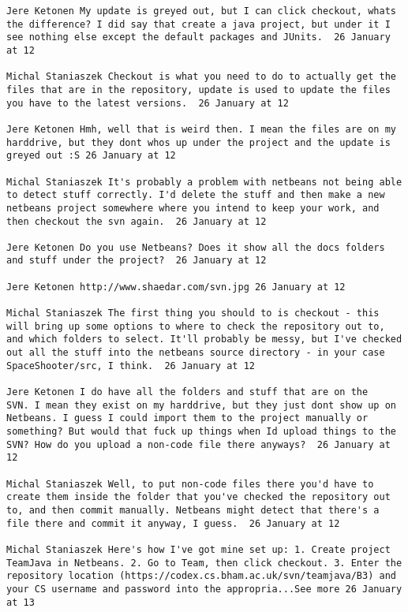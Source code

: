 \begin{verbatim}
Jere Ketonen My update is greyed out, but I can click checkout, whats
the difference? I did say that create a java project, but under it I
see nothing else except the default packages and JUnits.  26 January
at 12

Michal Staniaszek Checkout is what you need to do to actually get the
files that are in the repository, update is used to update the files
you have to the latest versions.  26 January at 12

Jere Ketonen Hmh, well that is weird then. I mean the files are on my
harddrive, but they dont whos up under the project and the update is
greyed out :S 26 January at 12

Michal Staniaszek It's probably a problem with netbeans not being able
to detect stuff correctly. I'd delete the stuff and then make a new
netbeans project somewhere where you intend to keep your work, and
then checkout the svn again.  26 January at 12

Jere Ketonen Do you use Netbeans? Does it show all the docs folders
and stuff under the project?  26 January at 12

Jere Ketonen http://www.shaedar.com/svn.jpg 26 January at 12

Michal Staniaszek The first thing you should to is checkout - this
will bring up some options to where to check the repository out to,
and which folders to select. It'll probably be messy, but I've checked
out all the stuff into the netbeans source directory - in your case
SpaceShooter/src, I think.  26 January at 12

Jere Ketonen I do have all the folders and stuff that are on the
SVN. I mean they exist on my harddrive, but they just dont show up on
Netbeans. I guess I could import them to the project manually or
something? But would that fuck up things when Id upload things to the
SVN? How do you upload a non-code file there anyways?  26 January at
12

Michal Staniaszek Well, to put non-code files there you'd have to
create them inside the folder that you've checked the repository out
to, and then commit manually. Netbeans might detect that there's a
file there and commit it anyway, I guess.  26 January at 12

Michal Staniaszek Here's how I've got mine set up: 1. Create project
TeamJava in Netbeans. 2. Go to Team, then click checkout. 3. Enter the
repository location (https://codex.cs.bham.ac.uk/svn/teamjava/B3) and
your CS username and password into the appropria...See more 26 January
at 13


\end{verbatim}
